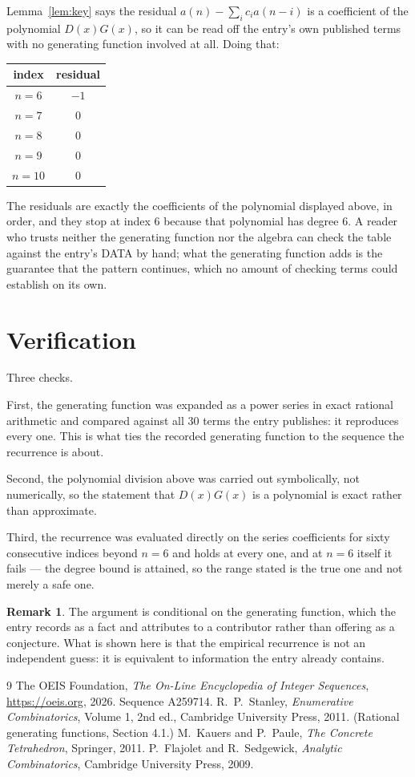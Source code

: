 \documentclass[11pt,a4paper]{article}
\theoremstyle{plain}
\theoremstyle{definition}
\newtheorem{remark}[theorem]{Remark}
\begin{document}
Lemma~\ref{lem:key} says the residual $a(n)-\sum_ic_ia(n-i)$ is a coefficient of the
polynomial $D(x)G(x)$, so it can be read off the entry's own published terms with no
generating function involved at all. Doing that:
\begin{center}
\begin{tabular}{cc}
index & residual \\ \hline
$n=6$ & $-1$ \\
$n=7$ & $0$ \\
$n=8$ & $0$ \\
$n=9$ & $0$ \\
$n=10$ & $0$
\end{tabular}
\end{center}
The residuals are exactly the coefficients of the polynomial displayed above, in order, and
they stop at index $6$ because that polynomial has degree $6$. A reader who trusts
neither the generating function nor the algebra can check the table against the entry's DATA
by hand; what the generating function adds is the guarantee that the pattern continues, which
no amount of checking terms could establish on its own.

\section{Verification}

Three checks.

First, the generating function was expanded as a power series in exact rational arithmetic and
compared against all $30$ terms the entry publishes: it reproduces every one. This is
what ties the recorded generating function to the sequence the recurrence is about.

Second, the polynomial division above was carried out symbolically, not numerically, so the
statement that $D(x)G(x)$ is a polynomial is exact rather than approximate.

Third, the recurrence was evaluated directly on the series coefficients for sixty consecutive
indices beyond $n=6$ and holds at every one, and at $n=6$ itself it fails --- the
degree bound is attained, so the range stated is the true one and not merely a safe one.

\begin{remark}
The argument is conditional on the generating function, which the entry records as a fact and
attributes to a contributor rather than offering as a conjecture. What is shown here is that
the empirical recurrence is not an independent guess: it is equivalent to information the
entry already contains.
\end{remark}

\begin{thebibliography}{9}
 The OEIS Foundation, \emph{The On-Line Encyclopedia of Integer
Sequences}, \url{https://oeis.org}, 2026. Sequence A259714.
 R.~P.~Stanley, \emph{Enumerative Combinatorics}, Volume 1, 2nd ed.,
Cambridge University Press, 2011. (Rational generating functions, Section 4.1.)
 M.~Kauers and P.~Paule, \emph{The Concrete Tetrahedron}, Springer, 2011.
 P.~Flajolet and R.~Sedgewick, \emph{Analytic Combinatorics}, Cambridge
University Press, 2009.
\end{thebibliography}
\end{document}
